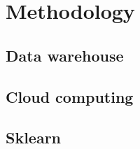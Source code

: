 \chapter{Methodology}  \label{ch:methodology}
\section{Data warehouse}
\section{Cloud computing}
\section{Sklearn}